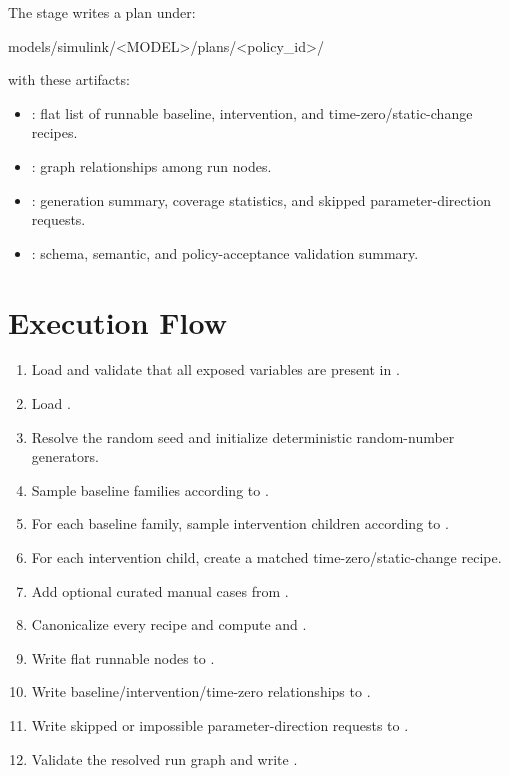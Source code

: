 \documentclass[11pt]{article}
\begin{document}
The stage writes a plan under:

\begin{DocCode}
models/simulink/<MODEL>/plans/<policy_id>/
\end{DocCode}

with these artifacts:

\begin{itemize}
\item {}: flat list of runnable baseline, intervention, and time-zero/static-change recipes.
\item {}: graph relationships among run nodes.
\item {}: generation summary, coverage statistics, and skipped parameter-direction requests.
\item {}: schema, semantic, and policy-acceptance validation summary.
\end{itemize}

\section*{Execution Flow}

\begin{enumerate}
\item Load  and validate that all exposed variables are present in .
\item Load .
\item Resolve the random seed and initialize deterministic random-number generators.
\item Sample baseline families according to .
\item For each baseline family, sample intervention children according to .
\item For each intervention child, create a matched time-zero/static-change recipe.
\item Add optional curated manual cases from .
\item Canonicalize every recipe and compute  and .
\item Write flat runnable nodes to .
\item Write baseline/intervention/time-zero relationships to .
\item Write skipped or impossible parameter-direction requests to .
\item Validate the resolved run graph and write .
\end{enumerate}
\end{document}
